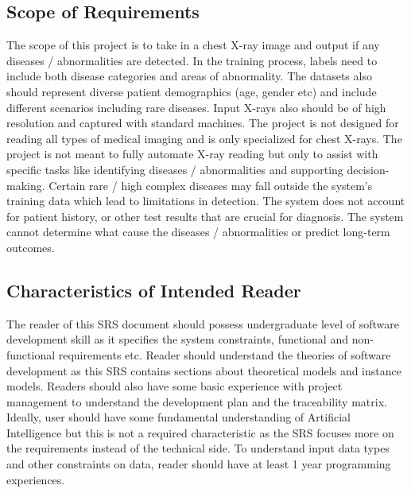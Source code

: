\documentclass[12pt]{article}
\begin{document}
\subsection{Scope of Requirements} 

The scope of this project is to take in a chest X-ray image and output if any diseases / abnormalities are detected. In the training process, labels need to include both disease categories and areas of abnormality. The datasets also should represent diverse patient demographics (age, gender etc) and include different scenarios including rare diseases. Input X-rays also should be of high resolution and captured with standard machines. The project is not designed for reading all types of medical imaging and is only specialized for chest X-rays. The project is not meant to fully automate X-ray reading but only to assist with specific tasks like identifying diseases / abnormalities and supporting decision-making. Certain rare / high complex diseases may fall outside the system's training data which lead to limitations in detection. The system does not account for patient history, or other test results that are crucial for diagnosis. The system cannot determine what cause the diseases / abnormalities or predict long-term outcomes. \\

\subsection{Characteristics of Intended Reader} \label{sec_IntendedReader}

The reader of this SRS document should possess undergraduate level of software development skill as it specifies the system constraints, functional and non-functional requirements etc. Reader should understand the theories of software development as this SRS contains sections about theoretical models and instance models. Readers should also have some basic experience with project management to understand the development plan and the traceability matrix. Ideally, user should have some fundamental understanding of Artificial Intelligence but this is not a required characteristic as the SRS focuses more on the requirements instead of the technical side. To understand input data types and other constraints on data, reader should have at least 1 year programming experiences.\\
\end{document}
